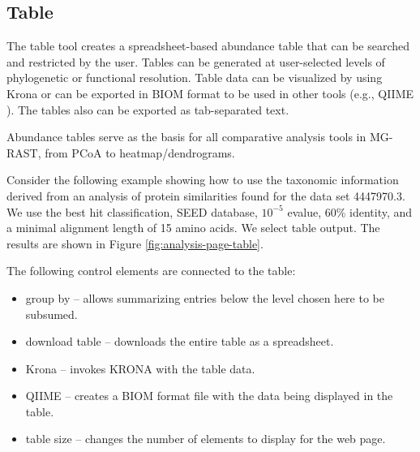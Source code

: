 \documentclass[12pt,fullpage]{report}
\begin{document}
\subsection{Table}

The table tool creates a spreadsheet-based abundance table that can be searched and restricted by the user. Tables can be generated at user-selected levels of phylogenetic or functional resolution. Table data can be visualized by using Krona \cite{KRONA} or  can be exported in BIOM\cite{BIOM} format to be used in other tools (e.g., QIIME \cite{QIIME}).  The tables also can be exported as tab-separated text.

Abundance tables serve as the basis for all comparative analysis tools in MG-RAST, from PCoA to heatmap/dendrograms.

Consider the following example showing how to use
the taxonomic information derived from an analysis of protein similarities found for the data set 4447970.3.
We use the best hit classification, \gls{SEED} database, $10^{-5}$ evalue, 60\% identity, and a minimal alignment length of 15 amino acids. We select table output. The results are shown in Figure \ref{fig:analysis-page-table}.

The following control elements are connected to the table:
\begin{itemize}
\item group by --
allows summarizing entries below the level chosen here to be subsumed.

\item download table --
downloads the entire table as a spreadsheet.

\item Krona --
invokes KRONA \cite{KRONA} with the table data.

\item QIIME --
creates a BIOM\cite{BIOM} format file with the data being displayed in the table.

\item table size --
changes the number of elements to display for the web page.

\end{itemize}
\end{document}
